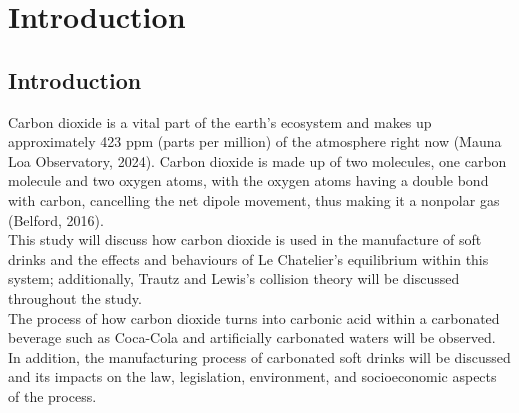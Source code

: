 \chapter{Introduction} \label{ch01}

\section{Introduction}

Carbon dioxide is a vital part of the earth's ecosystem and makes up approximately 423 ppm (parts per million) of the atmosphere right now (Mauna Loa Observatory, 2024).
Carbon dioxide is made up of two molecules, one carbon molecule and two oxygen atoms, with the oxygen atoms having a double bond with carbon, cancelling the net dipole movement, thus making it a nonpolar gas (Belford, 2016). \\

This study will discuss how carbon dioxide is used in the manufacture of soft drinks and the effects and behaviours of Le Chatelier's equilibrium within this system; additionally, Trautz and Lewis’s collision theory will be discussed throughout the study. \\

The process of how carbon dioxide turns into carbonic acid within a carbonated beverage such as Coca-Cola and artificially carbonated waters will be observed.
In addition, the manufacturing process of carbonated soft drinks will be discussed and its impacts on the law, legislation, environment, and socioeconomic aspects of the process. 



